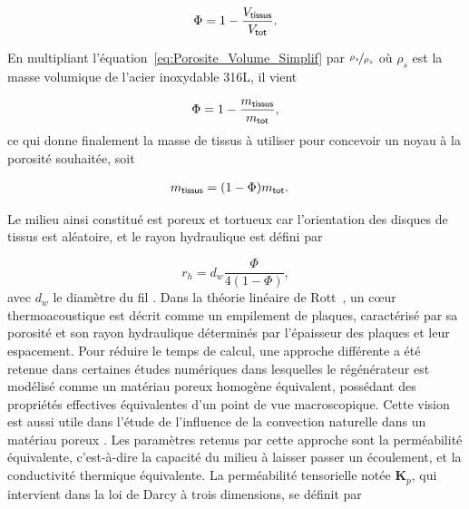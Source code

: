 \begin{equation}
	\Phi = 1 - \frac{V_{\sf tissus}}{V_{\sf tot}}.
	\label{eq:Porosite_Volume_Simplif}
\end{equation}

En multipliant l'équation~\eqref{eq:Porosite_Volume_Simplif} par $\nicefrac{\rho_s}{\rho_s}$ où $\rho_s$ est la masse volumique de l'acier inoxydable 316L, il vient

\begin{equation}
	\Phi = 1 - \frac{m_{\sf tissus}}{m_{\sf tot}},
	\label{eq:Porosite_Masse}
\end{equation}
ce qui donne finalement la masse de tissus à utiliser pour concevoir un noyau à la porosité souhaitée, soit

\begin{align}
	m_{\sf tissus} &= (1-\Phi) m_{\sf tot}. \label{eq:MasseTissus_Porosite}
\end{align}

Le milieu ainsi constitué est poreux et tortueux car l'orientation des disques de tissus est aléatoire, et le rayon hydraulique est défini par  %

\begin{equation}
	r_h = d_w\frac{\Phi}{4(1-\Phi)},
	\label{eq:DefRayonHydrauGantois}
\end{equation}
avec $d_w$ le diamètre du fil \cite{swift_thermoacoustics_2017}. Dans la théorie linéaire de Rott~\cite{rott_damped_1969, swift_thermoacoustics_2017}, un c\oe{}ur thermoacoustique est décrit comme un empilement de plaques, caractérisé par sa porosité et son rayon hydraulique déterminés par l'épaisseur des plaques et leur espacement. Pour réduire le temps de calcul, une approche différente a été retenue dans certaines études numériques dans lesquelles le régénérateur est modélisé comme un matériau poreux homogène équivalent, possédant des propriétés effectives équivalentes d'un point de vue macroscopique. Cette vision est aussi utile dans l'étude de l'influence de la convection naturelle dans un matériau poreux \cite{di_meglio_novel_2022, di_meglio_cfd_2022}. Les paramètres retenus par cette approche sont la perméabilité équivalente, c'est-à-dire la capacité du milieu à laisser passer un écoulement, et la conductivité thermique équivalente. La perméabilité tensorielle notée $\mathbf K_p$, qui intervient dans la loi de Darcy à trois dimensions, se définit par

